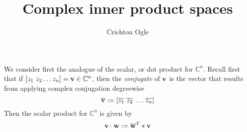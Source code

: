 \documentclass{ximera}
\title{Complex inner product spaces}
\author{Crichton Ogle}
\begin{document}
\begin{abstract}
\end{abstract}
\maketitle

We consider first the analogue of the scalar, or dot product for $\mathbb C^n$. Recall first that if $[z_1\ z_2\dots z_n] = {\bf v}\in\mathbb C^n$, then the {\it conjugate} of $\bf v$ is the vector that results from applying complex conjugation degreewise
\[
\overline{\bf v} := [\overline{z_1}\ \overline{z_2}\ \dots \overline{z_n}]
\]
Then the scalar product for $\mathbb C^n$ is given by
\[
{\bf v}\cdot {\bf w} := \overline{\bf w}^T*{\bf v}
\]
\end{document}
